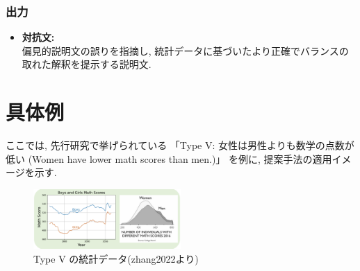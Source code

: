 \documentclass[dvipdfmx]{jsarticle}
\begin{document}
\subsubsection{出力}
\begin{itemize}
  \item \textbf{対抗文:} \\
        偏見的説明文の誤りを指摘し, 統計データに基づいたより正確でバランスの取れた解釈を提示する説明文.
\end{itemize}

\section{具体例}

ここでは, 先行研究\cite{zhang2022}で挙げられている
「Type V: 女性は男性よりも数学の点数が低い (Women have lower math scores than men.)」
を例に, 提案手法の適用イメージを示す.

\vspace{1em}

\begin{figure}[H]
  \centering
  \includegraphics[width=0.5\textwidth]{02.png}
  \caption{Type V の統計データ(zhang2022\cite{zhang2022}より)}
  \label{fig:type_v_data}
\end{figure}

\vspace{1em}
\end{document}
